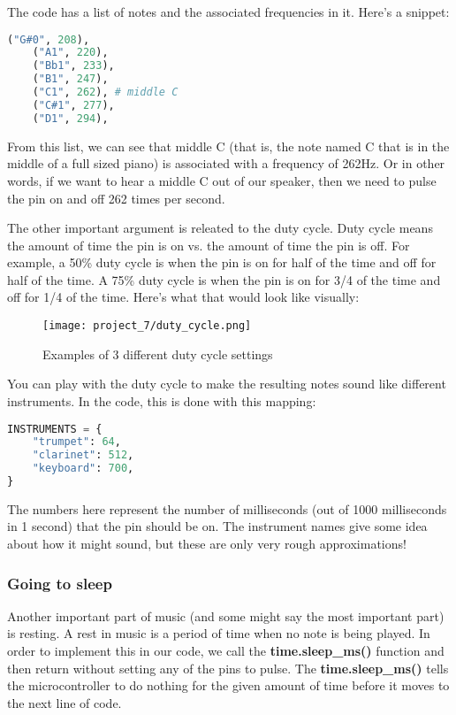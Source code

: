 The code has a list of notes and the associated frequencies in it. Here's a snippet:

\begin{lstlisting}[language=Python,caption=Note names mapped to frequencies]
    ("G#0", 208),
    ("A1", 220),
    ("Bb1", 233),
    ("B1", 247),
    ("C1", 262), # middle C
    ("C#1", 277),
    ("D1", 294),
\end{lstlisting}

From this list, we can see that middle C (that is, the note named C that is in the middle
of a full sized piano) is associated with a frequency of 262Hz. Or in other words, if we
want to hear a middle C out of our speaker, then we need to pulse the pin on and off 262
times per second.

The other important argument is releated to the duty cycle. Duty cycle means the amount
of time the pin is on vs. the amount of time the pin is off. For example, a 50\% duty cycle
is when the pin is on for half of the time and off for half of the time. A 75\% duty cycle
is when the pin is on for 3/4 of the time and off for 1/4 of the time. Here's what that
would look like visually:

\begin{figure}[H]
    \centering
    \texttt{[image: project\_7/duty\_cycle.png]}
    \caption{Examples of 3 different duty cycle settings}
\end{figure}

You can play with the duty cycle to make the resulting notes sound like different instruments.
In the code, this is done with this mapping:

\begin{lstlisting}[language=Python,caption=Instrument names mapped to duty cycle settings]
INSTRUMENTS = {
    "trumpet": 64,
    "clarinet": 512,
    "keyboard": 700,
}
\end{lstlisting}

The numbers here represent the number of milliseconds (out of 1000 milliseconds in 1 second)
that the pin should be on. The instrument names give some idea about how it might sound, but
these are only very rough approximations!

\subsubsection{Going to sleep}

Another important part of music (and some might say the most important part) is resting.
A rest in music is a period of time when no note is being played. In order to implement
this in our code, we call the \textbf{time.sleep\_ms()} function and then return without
setting any of the pins to pulse. The \textbf{time.sleep\_ms()} tells the microcontroller to
do nothing for the given amount of time before it moves to the next line of code.

